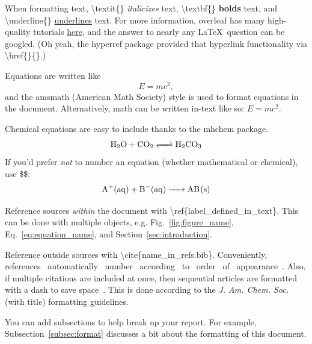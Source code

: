 When formatting text, \textbackslash textit\{\} \textit{italicizes} text, \textbackslash textbf\{\} \textbf{bolds} text, and \textbackslash underline\{\} \underline{underlines} text. For more information, overleaf has many high-quality tutorials \href{https://www.overleaf.com/learn/latex/Tutorials}{here}, and the answer to nearly any \LaTeX\ question can be googled. (Oh yeah, the hyperref package provided that hyperlink functionality via \textbackslash href\{\}\{\}.)  

Equations are written like
\begin{equation}
    \label{eq:equation_name}
    E = mc^2, 
\end{equation}
and the amsmath (American Math Society) style is used to format equations in the document. Alternatively, math can be written in-text like so: $E=mc^2$. 

Chemical equations are easy to include thanks to the mhchem package. 
\begin{equation}
    \label{eq:carbonic_acid_equilibrium}
    \ce{ 
    H2O + CO2 <=> H2CO3
    }
\end{equation}
If you'd prefer \textit{not} to number an equation (whether mathematical or chemical), use \$\$:
$$ \ce{ A+(aq) + B-(aq) -> AB(s) } $$

Reference sources \textit{within} the document with \textbackslash ref\{label\_defined\_in\_text\}. This can be done with multiple objects, e.g. Fig.~\ref{fig:figure_name}, Eq.~\ref{eq:equation_name}, and Section~\ref{sec:introduction}. 

Reference outside sources with \textbackslash cite\{name\_in\_refs.bib\}. Conveniently, references~\cite{youssef_scalable_2021} automatically~\cite{sood_coupling_2022} number~\cite{schuette_decorrelating_2023} according~\cite{schuette_applying_2020} to~\cite{youssef_scalable_2023} order~\cite{schuette_efficient_2023} of~\cite{zhang_topology_2015} appearance~\cite{zhang_shape_2016}. Also, if multiple citations are included at once, then sequential articles are formatted with a dash to save space~\cite{sood_coupling_2022,youssef_scalable_2021,schuette_decorrelating_2023,youssef_scalable_2023,schuette_efficient_2023,zhang_topology_2015,zhang_shape_2016,schuette_applying_2020}. This is done according to the \textit{J. Am. Chem. Soc.} (with title) formatting guidelines. 

You can add subsections to help break up your report. For example, Subsection~\ref{subsec:format} discusses a bit about the formatting of this document. 

